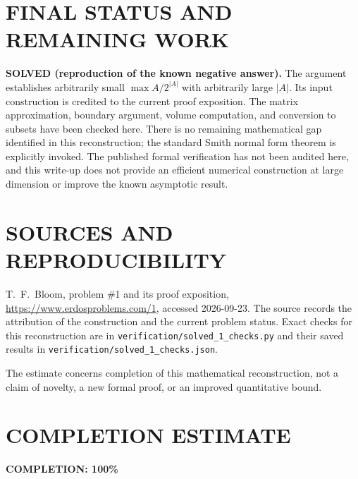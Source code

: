 \section{FINAL STATUS AND REMAINING WORK}
\textbf{SOLVED (reproduction of the known negative answer).}
The argument establishes arbitrarily small $\max A/2^{|A|}$ with
arbitrarily large $|A|$. Its input construction is credited to the
current proof exposition. The matrix approximation, boundary argument,
volume computation, and conversion to subsets have been checked here.
There is no remaining mathematical gap identified in this reconstruction;
the standard Smith normal form theorem is explicitly invoked. The
published formal verification has not been audited here, and this
write-up does not provide an efficient numerical construction at large
dimension or improve the known asymptotic result.

\section{SOURCES AND REPRODUCIBILITY}
T.~F.~Bloom, problem \#1 and its proof exposition,
\url{https://www.erdosproblems.com/1}, accessed 2026-09-23.
The source records the attribution of the construction and the current
problem status. Exact checks for this reconstruction are in
\texttt{verification/solved\_1\_checks.py} and their saved results in
\texttt{verification/solved\_1\_checks.json}.

The estimate concerns completion of this mathematical reconstruction,
not a claim of novelty, a new formal proof, or an improved quantitative
bound.

\section{COMPLETION ESTIMATE}
\textbf{COMPLETION: 100\%}
